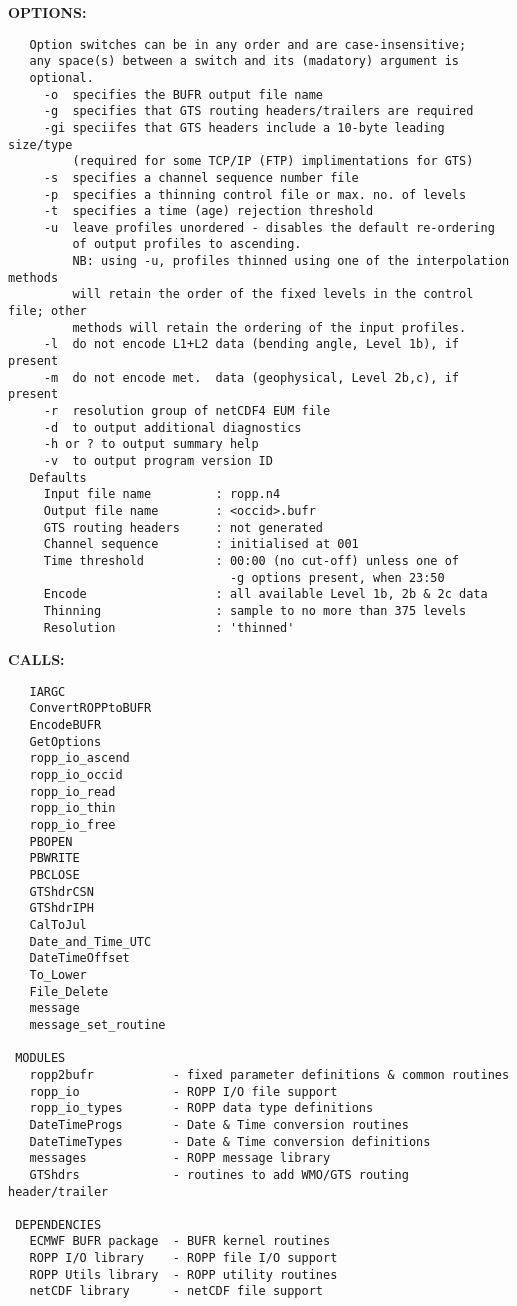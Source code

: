 \textbf{OPTIONS:}\hspace{0.08in}\begin{Verbatim}
   Option switches can be in any order and are case-insensitive;
   any space(s) between a switch and its (madatory) argument is
   optional.
     -o  specifies the BUFR output file name
     -g  specifies that GTS routing headers/trailers are required
     -gi speciifes that GTS headers include a 10-byte leading size/type
         (required for some TCP/IP (FTP) implimentations for GTS)
     -s  specifies a channel sequence number file
     -p  specifies a thinning control file or max. no. of levels
     -t  specifies a time (age) rejection threshold
     -u  leave profiles unordered - disables the default re-ordering
         of output profiles to ascending.
         NB: using -u, profiles thinned using one of the interpolation methods
         will retain the order of the fixed levels in the control file; other
         methods will retain the ordering of the input profiles.
     -l  do not encode L1+L2 data (bending angle, Level 1b), if present
     -m  do not encode met.  data (geophysical, Level 2b,c), if present
     -r  resolution group of netCDF4 EUM file
     -d  to output additional diagnostics
     -h or ? to output summary help
     -v  to output program version ID
   Defaults
     Input file name         : ropp.n4
     Output file name        : <occid>.bufr
     GTS routing headers     : not generated
     Channel sequence        : initialised at 001
     Time threshold          : 00:00 (no cut-off) unless one of
                               -g options present, when 23:50
     Encode                  : all available Level 1b, 2b & 2c data
     Thinning                : sample to no more than 375 levels
     Resolution              : 'thinned'
\end{Verbatim}
\textbf{CALLS:}\hspace{0.08in}\begin{Verbatim}
   IARGC
   ConvertROPPtoBUFR
   EncodeBUFR
   GetOptions
   ropp_io_ascend
   ropp_io_occid
   ropp_io_read
   ropp_io_thin
   ropp_io_free
   PBOPEN
   PBWRITE
   PBCLOSE
   GTShdrCSN
   GTShdrIPH
   CalToJul
   Date_and_Time_UTC
   DateTimeOffset
   To_Lower
   File_Delete
   message
   message_set_routine

 MODULES
   ropp2bufr           - fixed parameter definitions & common routines
   ropp_io             - ROPP I/O file support
   ropp_io_types       - ROPP data type definitions
   DateTimeProgs       - Date & Time conversion routines
   DateTimeTypes       - Date & Time conversion definitions
   messages            - ROPP message library
   GTShdrs             - routines to add WMO/GTS routing header/trailer

 DEPENDENCIES
   ECMWF BUFR package  - BUFR kernel routines
   ROPP I/O library    - ROPP file I/O support
   ROPP Utils library  - ROPP utility routines
   netCDF library      - netCDF file support
\end{Verbatim}
